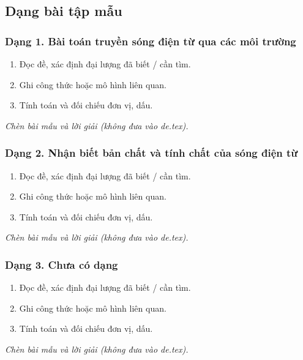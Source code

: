 

\subsection{Dạng bài tập mẫu}
\subsubsection{Dạng 1. Bài toán truyền sóng điện từ qua các môi trường}
\begin{phuongphap}
\begin{enumerate}
\item Đọc đề, xác định đại lượng đã biết / cần tìm.
\item Ghi công thức hoặc mô hình liên quan.
\item Tính toán và đối chiếu đơn vị, dấu.
\end{enumerate}
\end{phuongphap}
\begin{vidumau}
\textit{Chèn bài mẫu và lời giải (không đưa vào de.tex).}
\end{vidumau}

\subsubsection{Dạng 2. Nhận biết bản chất và tính chất của sóng điện từ}
\begin{phuongphap}
\begin{enumerate}
\item Đọc đề, xác định đại lượng đã biết / cần tìm.
\item Ghi công thức hoặc mô hình liên quan.
\item Tính toán và đối chiếu đơn vị, dấu.
\end{enumerate}
\end{phuongphap}
\begin{vidumau}
\textit{Chèn bài mẫu và lời giải (không đưa vào de.tex).}
\end{vidumau}

\subsubsection{Dạng 3. Chưa có dạng}
\begin{phuongphap}
\begin{enumerate}
\item Đọc đề, xác định đại lượng đã biết / cần tìm.
\item Ghi công thức hoặc mô hình liên quan.
\item Tính toán và đối chiếu đơn vị, dấu.
\end{enumerate}
\end{phuongphap}
\begin{vidumau}
\textit{Chèn bài mẫu và lời giải (không đưa vào de.tex).}
\end{vidumau}

